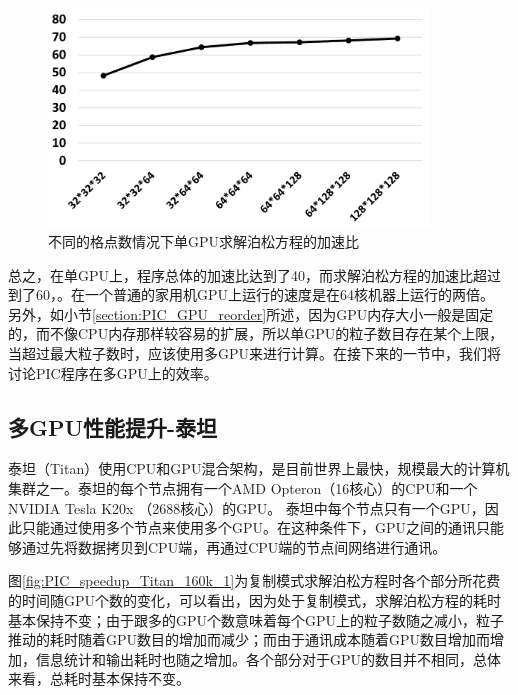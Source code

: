 \begin{figure}[!htb]
  \centering
  \includegraphics[width=0.9\textwidth]{Img/PIC_speedup_1GPU_Poisson.pdf}
  \caption{不同的格点数情况下单GPU求解泊松方程的加速比}
  \label{fig:PIC_speedup_1GPU_Poisson}
\end{figure}

总之，在单GPU上，程序总体的加速比达到了40，而求解泊松方程的加速比超过到了60，。在一个普通的家用机GPU上运行的速度是在64核机器上运行的两倍。
另外，如小节\ref{section:PIC_GPU_reorder}所述，因为GPU内存大小一般是固定的，而不像CPU内存那样较容易的扩展，所以单GPU的粒子数目存在某个上限，当超过最大粒子数时，应该使用多GPU来进行计算。在接下来的一节中，我们将讨论PIC程序在多GPU上的效率。

\subsection{多GPU性能提升-泰坦}
泰坦（Titan）使用CPU和GPU混合架构，是目前世界上最快，规模最大的计算机集群之一。泰坦的每个节点拥有一个AMD Opteron（16核心）的CPU和一个NVIDIA Tesla K20x （2688核心）的GPU。
泰坦中每个节点只有一个GPU，因此只能通过使用多个节点来使用多个GPU。在这种条件下，GPU之间的通讯只能够通过先将数据拷贝到CPU端，再通过CPU端的节点间网络进行通讯。

图\ref{fig:PIC_speedup_Titan_160k_1}为复制模式求解泊松方程时各个部分所花费的时间随GPU个数的变化，可以看出，因为处于复制模式，求解泊松方程的耗时基本保持不变；由于跟多的GPU个数意味着每个GPU上的粒子数随之减小，粒子推动的耗时随着GPU数目的增加而减少；而由于通讯成本随着GPU数目增加而增加，信息统计和输出耗时也随之增加。各个部分对于GPU的数目并不相同，总体来看，总耗时基本保持不变。

